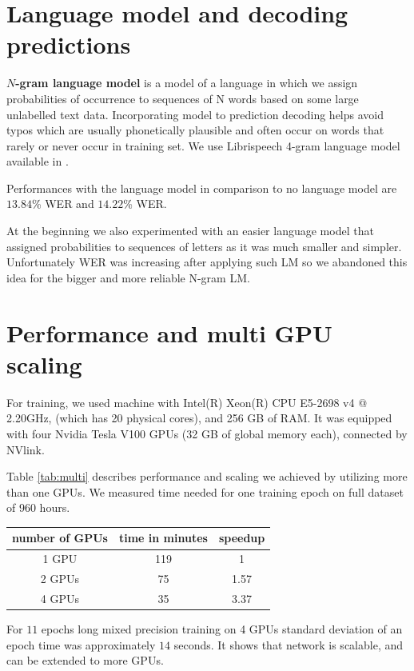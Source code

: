 \documentclass[licencjacka,en]{pracamgr}
\begin{document}
	
	\section{Language model and decoding predictions}
	\textbf{$N$-gram language model} is a model of a language in which we assign probabilities of occurrence to sequences of N words based on some large unlabelled text data. Incorporating model to prediction decoding helps avoid typos which are usually phonetically plausible and often occur on words that rarely or never occur in training set. We use Librispeech 4-gram language model available in \cite{LM-LINK}.
	
	Performances with the language model in comparison to no language model are $13.84$\% WER and $14.22$\% WER.
	
	At the beginning we also experimented with an easier language model that assigned probabilities to sequences of letters as it was much smaller and simpler. Unfortunately WER was increasing after applying such LM so we abandoned this idea for the bigger and more reliable N-gram LM.
	
	
	\section{Performance and multi GPU scaling}
	For training, we used machine with Intel(R) Xeon(R) CPU E5-2698 v4 @ 2.20GHz, (which has 20 physical cores), and 256 GB of RAM. It was equipped with four Nvidia Tesla V100 GPUs (32 GB of global memory each), connected by NVlink.
	
	Table \ref{tab:multi} describes performance and scaling we achieved by utilizing more than one GPUs. We measured time needed for one training epoch on full dataset of 960 hours.
	
	{
		\centering
		\begin{tabular}{|c|c|c|}
			\hline
			number of GPUs & time in minutes & speedup \\
			\hline
			1 GPU & 119 & 1 \\
			\hline
			2 GPUs & 75 & 1.57 \\
			\hline
			4 GPUs & 35 & 3.37 \\
			\hline
		\end{tabular}
		\label{tab:multi}
	}
	
	For $11$ epochs long mixed precision training on 4 GPUs standard deviation of an epoch time was approximately $14$ seconds. It shows that network is scalable, and can be extended to more GPUs.
	
\end{document}
